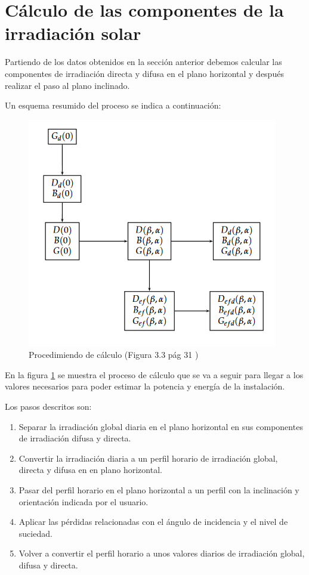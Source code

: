 \documentclass[11pt]{report}
\begin{document}
\section{Cálculo de las componentes de la irradiación solar}

Partiendo de los datos obtenidos en la sección anterior debemos calcular las componentes de irradiación directa y difusa en el plano horizontal y después realizar el paso al plano inclinado.

Un esquema resumido del proceso se indica a continuación:

\begin{figure}[ht]
\includegraphics[scale=0.7]{32_ESFBOOK_1}
\centering
\caption{Procedimiendo de cálculo (Figura 3.3 pág 31 \cite{esf_book})}
\label{fig:fig_1}
\end{figure}

En la figura \ref{fig:fig_1} se muestra el proceso de cálculo que se va a seguir para llegar a los valores necesarios para poder estimar la potencia y energía de la instalación.

Los pasos descritos son:
\begin{enumerate}
	\item Separar la irradiación global diaria en el plano horizontal en sus componentes de irradiación difusa y directa.
	\item Convertir la irradiación diaria a un perfil horario de irradiación global, directa y difusa en en plano horizontal.
	\item Pasar del perfil horario en el plano horizontal a un perfil con la inclinación y orientación indicada por el usuario.
	\item Aplicar las pérdidas relacionadas con el ángulo de incidencia y el nivel de suciedad.
	\item Volver a convertir el perfil horario a unos valores diarios de irradiación global, difusa y directa.
\end{enumerate}
\end{document}
